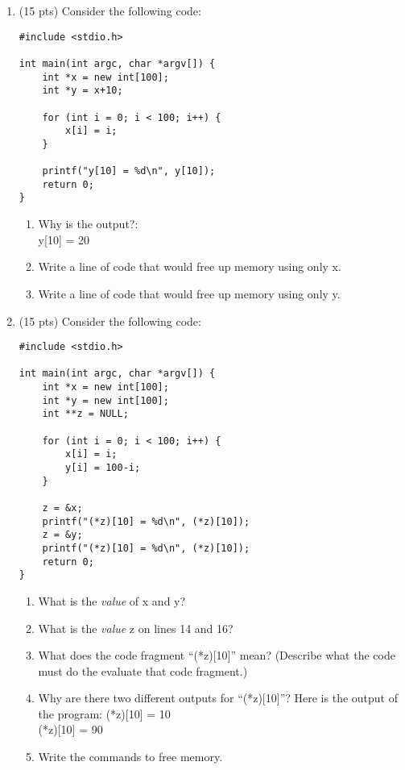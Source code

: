 \documentclass[12pt]{article}
\begin{document}
\begin{enumerate}
\item (15 pts) Consider the following code:\\
\begin{lstlisting}
#include <stdio.h>

int main(int argc, char *argv[]) {
    int *x = new int[100];
    int *y = x+10;

    for (int i = 0; i < 100; i++) {
        x[i] = i;
    }

    printf("y[10] = %d\n", y[10]);
    return 0;
}

\end{lstlisting}
\begin{enumerate}
\item Why is the output?: \\
y[10] = 20 \\
\item Write a line of code that would free up memory using only x.
\item Write a line of code that would free up memory using only y.
\end{enumerate}

\pagebreak

\item (15 pts) Consider the following code:\\
\begin{lstlisting}
#include <stdio.h>

int main(int argc, char *argv[]) {
    int *x = new int[100];
    int *y = new int[100];
    int **z = NULL;

    for (int i = 0; i < 100; i++) {
        x[i] = i;
        y[i] = 100-i;
    }

    z = &x;
    printf("(*z)[10] = %d\n", (*z)[10]);
    z = &y;
    printf("(*z)[10] = %d\n", (*z)[10]);
    return 0;
}
\end{lstlisting}
\begin{enumerate}
\item What is the \textit{value} of x and y?
\item What is the \textit{value} z on lines 14 and 16?
\item What does the code fragment ``(*z)[10]'' mean? (Describe what the code must do the evaluate that code fragment.)
\item Why are there two different outputs for ``(*z)[10]''?  Here is the output of the program:
(*z)[10] = 10 \\
(*z)[10] = 90
\item Write the commands to free memory.
\end{enumerate}


\end{enumerate}
\end{document}
